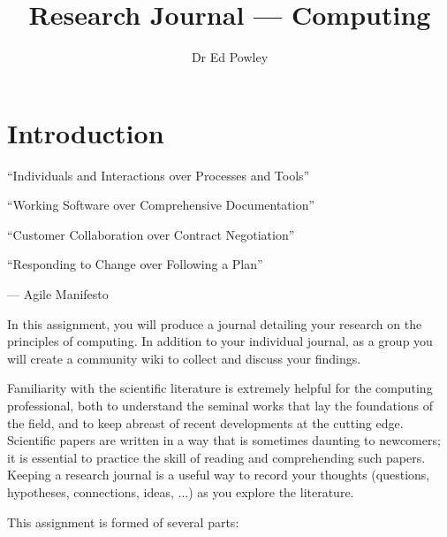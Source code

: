 \documentclass{../fal_assignment}
\title{Research Journal --- Computing}
\author{Dr Ed Powley}
\begin{document}
\maketitle

\section*{Introduction}

\begin{marginquote}
  ``Individuals and Interactions over Processes and Tools''
  
  ``Working Software over Comprehensive Documentation''
  
  ``Customer Collaboration over Contract Negotiation''
  
  ``Responding to Change over Following a Plan''
    
    --- Agile Manifesto
\end{marginquote}

In this assignment, you will produce a journal detailing your research on the principles of computing.
In addition to your individual journal, as a group you will create a community wiki to collect and discuss your findings.

Familiarity with the scientific literature is extremely helpful for the computing professional,
both to understand the seminal works that lay the foundations of the field,
and to keep abreast of recent developments at the cutting edge.
Scientific papers are written in a way that is sometimes daunting to newcomers;
it is essential to practice the skill of reading and comprehending such papers.
Keeping a research journal is a useful way to record your thoughts
(questions, hypotheses, connections, ideas, ...) as you explore the literature.

This assignment is formed of several parts:
\end{document}
